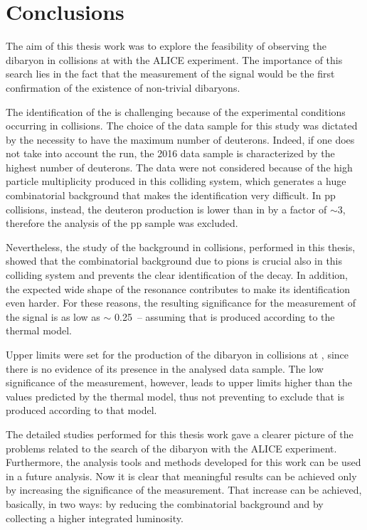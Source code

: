 %
\chapter{Conclusions} \label{sec:5}

The aim of this thesis work was to explore the feasibility of observing the \dst dibaryon in \pPb collisions 
at \sctev with the ALICE experiment.
The importance of this search lies in the fact that the measurement of the \ds signal would be the first
confirmation of the existence of non-trivial dibaryons.

The identification of the \ds is challenging because of the experimental conditions occurring in 
\pPb collisions. The choice of the \pPb data sample for this study was dictated by the necessity to have 
the maximum number of deuterons.
Indeed, if one does not take into account the \PbPb run, the 2016 \pPb data sample is characterized by the highest number of deuterons. 
The \PbPb data were not considered because of the high particle multiplicity produced in this colliding
system, which generates a huge combinatorial background that makes the \ds identification very difficult.
In pp collisions, instead, the deuteron production is lower than in \pPb by a factor of $\sim 3$, therefore
the analysis of the pp sample was excluded.

Nevertheless, the study of the background in \pPb collisions, performed in this thesis, showed that the
combinatorial background due to pions is crucial also in this colliding system and prevents the clear 
identification of the \ds decay. 
In addition, the expected wide shape of the \ds resonance contributes to make its identification even harder.
For these reasons, the resulting significance for the measurement of the \ds signal is as low as $\sim $ 0.25\ -- assuming that \ds
is produced according to the thermal model.

Upper limits were set for the production of the \ds dibaryon in \pPb collisions at \sctev, since there is
no evidence of its presence in the analysed data sample. The low significance of the measurement, however, 
leads to upper limits higher than the values predicted by the thermal model, thus not preventing to exclude that \ds is produced according to that model.

The detailed studies performed for this thesis work gave a clearer picture of the 
problems related to the search of the \ds dibaryon with the ALICE experiment. 
Furthermore, the analysis tools and methods developed for this work can be used in a future analysis.
Now it is clear that meaningful results can be achieved only by increasing the significance of the
measurement.
That increase can be achieved, basically, in two ways: by reducing the 
combinatorial background and by collecting a higher integrated luminosity.

